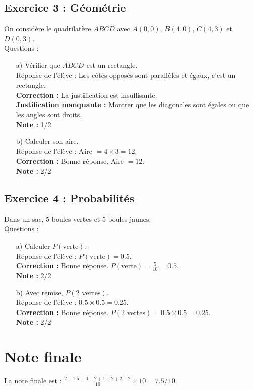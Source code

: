 \documentclass{article}
\begin{document}
\subsection*{Exercice 3 : Géométrie}
On considère le quadrilatère \( ABCD \) avec \( A(0,0) \), \( B(4,0) \), \( C(4,3) \) et \( D(0,3) \). \\
Questions : 
\begin{enumerate}
    \item[a)] Vérifier que \( ABCD \) est un rectangle. \\
    Réponse de l’élève : Les côtés opposés sont parallèles et égaux, c’est un rectangle. \\
    \textbf{Correction :} La justification est insuffisante. \\
    \textbf{Justification manquante :} Montrer que les diagonales sont égales ou que les angles sont droits. \\
    \textbf{Note :} 1/2
    \item[b)] Calculer son aire. \\
    Réponse de l’élève : Aire \( = 4 \times 3 = 12 \). \\
    \textbf{Correction :} Bonne réponse. Aire \( = 12 \). \\
    \textbf{Note :} 2/2
\end{enumerate}

\subsection*{Exercice 4 : Probabilités}
Dans un sac, 5 boules vertes et 5 boules jaunes. \\
Questions : 
\begin{enumerate}
    \item[a)] Calculer \( P(\text{verte}) \). \\
    Réponse de l’élève : \( P(\text{verte}) = 0.5 \). \\
    \textbf{Correction :} Bonne réponse. \( P(\text{verte}) = \frac{5}{10} = 0.5 \). \\
    \textbf{Note :} 2/2
    \item[b)] Avec remise, \( P(2 \text{ vertes}) \). \\
    Réponse de l’élève : \( 0.5 \times 0.5 = 0.25 \). \\
    \textbf{Correction :} Bonne réponse. \( P(2 \text{ vertes}) = 0.5 \times 0.5 = 0.25 \). \\
    \textbf{Note :} 2/2
\end{enumerate}

\section*{Note finale}
La note finale est : \( \frac{2 + 1.5 + 0 + 2 + 1 + 2 + 2 + 2}{10} \times 10 = 7.5/10 \).
\end{document}
